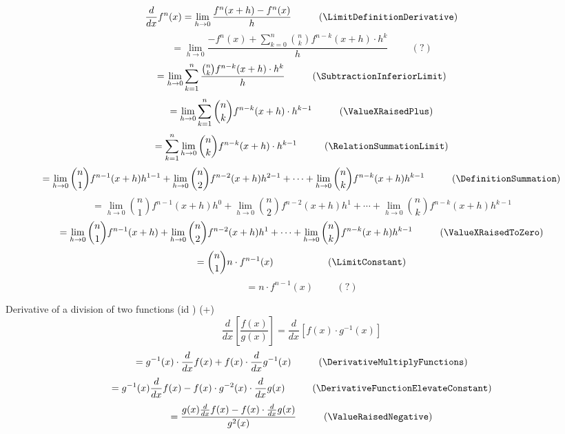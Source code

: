 \documentclass{book}
\begin{document}
                    \[\frac{d}{dx} f^n(x) = \lim_{h \rightarrow 0} \frac{f^n(x + h) - f^n(x)}{h} \hspace{1cm} (\LimitDefinitionDerivative)\]
                    \[= \lim_{h \rightarrow 0} \frac{-f^n(x) + \sum^n_{k=0} \binom{n}{k} f^{n - k}(x + h) \cdot h^k}{h} \hspace{1cm} (?)\]
                    \[= \lim_{h \rightarrow 0} \sum^n_{k=1} \frac{\binom{n}{k} f^{n - k}(x + h) \cdot h^k}{h} \hspace{1cm} (\SubtractionInferiorLimit)\]
                    \[= \lim_{h \rightarrow 0} \sum^n_{k=1} \binom{n}{k} f^{n - k}(x + h) \cdot h^{k - 1} \hspace{1cm} (\ValueXRaisedPlus)\]
                    \[= \sum^n_{k=1} \lim_{h \rightarrow 0} \binom{n}{k} f^{n - k} (x + h) \cdot h^{k - 1} \hspace{1cm} (\RelationSummationLimit)\]
                    \[= \lim_{h \rightarrow 0} \binom{n}{1} f^{n - 1}(x + h) h^{1 - 1} + \lim_{h \rightarrow 0} \binom{n}{2} f^{n - 2}(x + h) h^{2 - 1} + \cdots + \lim_{h \rightarrow 0}\binom{n}{k} f^{n - k}(x + h) h^{k - 1} \hspace{1cm} (\DefinitionSummation)\]
                    \[= \lim_{h \rightarrow 0} \binom{n}{1} f^{n - 1}(x + h) h^0 + \lim_{h \rightarrow 0} \binom{n}{2} f^{n - 2} (x + h) h^1 + \cdots + \lim_{h \rightarrow 0} \binom{n}{k} f^{n - k}(x + h) h^{k - 1}\]
                    \[= \lim_{h \rightarrow 0} \binom{n}{1} f^{n - 1}(x + h) + \lim_{h \rightarrow 0} \binom{n}{2} f^{n - 2}(x + h) h^1 + \cdots + \lim_{h \rightarrow 0} \binom{n}{k} f^{n - k}(x + h) h^{k - 1} \hspace{1cm} (\ValueXRaisedToZero)\]
                    \[= \binom{n}{1} n \cdot f^{n - 1}(x) \hspace{1cm} \hspace{1cm} (\LimitConstant)\]
                    \[= n \cdot f^{n - 1}(x) \hspace{1cm} (?)\]

                    Derivative of a division of two functions (id \DerivativeDivisionTwoFunctions) (+)
                    \[\frac{d}{dx} \left[\frac{f(x)}{g(x)}\right] = \frac{d}{dx} [f(x) \cdot g^{-1}(x)]\]
                    \[= g^{-1}(x) \cdot \frac{d}{dx}f(x) + f(x) \cdot \frac{d}{dx} g^{-1}(x) \hspace{1cm} (\DerivativeMultiplyFunctions)\]
                    \[= g^{-1}(x) \frac{d}{dx} f(x) - f(x) \cdot g^{-2}(x) \cdot \frac{d}{dx}g(x) \hspace{1cm} (\DerivativeFunctionElevateConstant)\]
                    \[= \frac{g(x) \frac{d}{dx} f(x) - f(x) \cdot \frac{d}{dx} g(x)}{g^2(x)} \hspace{1cm} (\ValueRaisedNegative)\]
\end{document}

